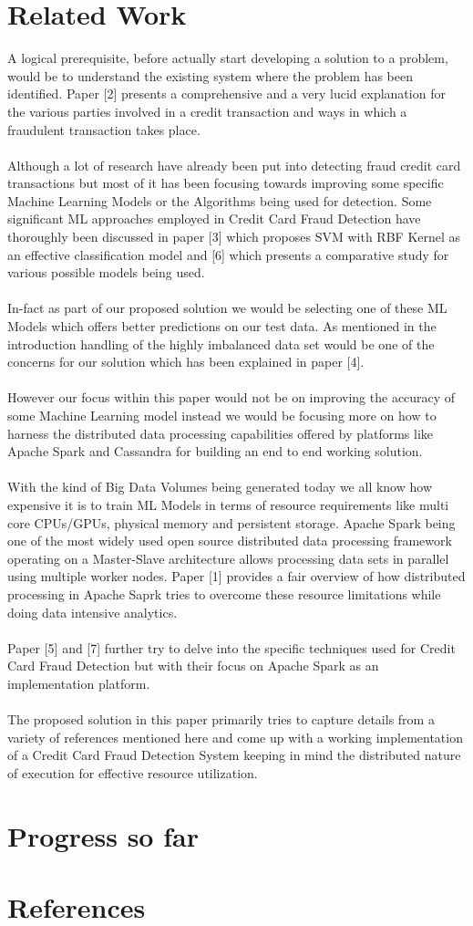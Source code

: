 \documentclass{vldb}
\begin{document}
\section{Related Work}
A logical prerequisite, before actually start developing a solution to a problem, would be to understand the existing system where the problem has been identified. Paper [2] presents a comprehensive and a very lucid explanation for the various parties involved in a credit transaction and ways in which a fraudulent transaction takes place.\\\\
Although a lot of research have already been put into detecting fraud credit card transactions but most of it has been focusing towards improving some specific Machine Learning Models or the Algorithms being used for detection. Some significant ML approaches employed in Credit Card Fraud Detection have thoroughly been discussed in paper [3] which proposes SVM with RBF Kernel as an effective classification model and [6] which presents a comparative study for various possible models being used.\\\\
In-fact as part of our proposed solution we would be selecting one of these ML Models which offers better predictions on our test data.
As mentioned in the introduction handling of the highly imbalanced data set would be one of the concerns for our solution
which has been explained in paper [4].\\\\
However our focus within this paper would not be on improving the accuracy of some Machine Learning model instead
we would be focusing more on how to harness the distributed data processing capabilities offered by platforms like
Apache Spark and Cassandra for building an end to end working solution.\\\\
With the kind of Big Data Volumes being generated today we all know how expensive it is to train ML Models in terms of resource requirements like multi core CPUs/GPUs, physical memory and persistent storage. Apache Spark being one of the most widely used open source distributed data processing framework operating on a Master-Slave architecture allows processing data sets in parallel using multiple worker nodes. Paper [1] provides a fair overview of how distributed processing in Apache Saprk tries to overcome these resource limitations while doing data intensive analytics.\\\\
Paper [5] and [7] further try to delve into the specific techniques used for Credit Card Fraud Detection but with their focus on Apache Spark as an implementation platform.\\\\
The proposed solution in this paper primarily tries to capture details from a variety of references mentioned here and come up with a working implementation of a Credit Card Fraud Detection System keeping in mind the distributed nature of execution for effective resource utilization.\\
\section{Progress so far}
\section{References}
\end{document}
